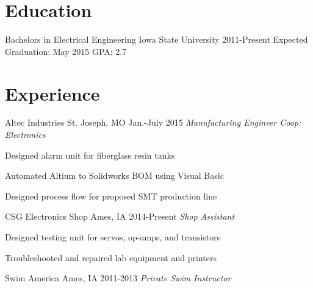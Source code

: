 \documentclass[]{friggeri-cv} %
\begin{document}
\section{Education}
\begin{entrylist}
\entry
{Bachelors in Electrical Engineering}
{Iowa State University}
{2011-Present}
{Expected Graduation: May 2015}
{GPA: 2.7}
\end{entrylist}
\section{Experience}

\begin{entrylist}
\entry
{Altec Industries}
{St. Joseph, MO}
{Jan.-July 2015}
{\emph{Manufacturing Engineer Coop: Electronics}}
{\begin{itemizenosep}
	\item Designed alarm unit for fiberglass resin tanks
	\item Automated Altium to Solidworks BOM using Visual Basic
	\item Designed process flow for proposed SMT production line
\end{itemizenosep}}
\entry
{CSG Electronics Shop}
{Ames, IA}
{2014-Present}
{\emph{Shop Assistant}}
{\begin{itemizenosep}
	\item Designed testing unit for servos, op-amps, and transistors
	\item Troubleshooted and repaired lab equipment and printers
\end{itemizenosep}}
\entry
{Swim America}
{Ames, IA}
{2011-2013}
{\emph{Private Swim Instructor}}
{}
\end{entrylist}
\end{document}
